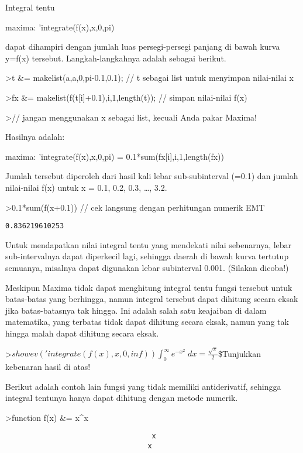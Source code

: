 \documentclass[
]{book}
\begin{document}
Integral tentu

maxima: 'integrate(f(x),x,0,pi)

dapat dihampiri dengan jumlah luas persegi-persegi panjang di bawah kurva y=f(x) tersebut. Langkah-langkahnya adalah sebagai berikut.

\textgreater t \&= makelist(a,a,0,pi-0.1,0.1); // t sebagai list untuk menyimpan nilai-nilai x

\textgreater fx \&= makelist(f(t{[}i{]}+0.1),i,1,length(t)); // simpan nilai-nilai f(x)

\textgreater// jangan menggunakan x sebagai list, kecuali Anda pakar Maxima!

Hasilnya adalah:

maxima: 'integrate(f(x),x,0,pi) = 0.1*sum(fx{[}i{]},i,1,length(fx))

Jumlah tersebut diperoleh dari hasil kali lebar sub-subinterval (=0.1) dan jumlah nilai-nilai f(x) untuk x = 0.1, 0.2, 0.3, \ldots, 3.2.

\textgreater0.1*sum(f(x+0.1)) // cek langsung dengan perhitungan numerik EMT

\begin{verbatim}
0.836219610253
\end{verbatim}

Untuk mendapatkan nilai integral tentu yang mendekati nilai sebenarnya, lebar sub-intervalnya dapat diperkecil lagi, sehingga daerah di bawah kurva tertutup semuanya, misalnya dapat digunakan lebar subinterval 0.001. (Silakan dicoba!)

Meskipun Maxima tidak dapat menghitung integral tentu fungsi tersebut untuk batas-batas yang berhingga, namun integral tersebut dapat dihitung secara eksak jika batas-batasnya tak hingga. Ini adalah salah satu keajaiban di dalam matematika, yang terbatas tidak dapat dihitung secara eksak, namun yang tak hingga malah dapat dihitung secara eksak.

\textgreater{}\(showev('integrate(f(x),x,0,inf))\)\(\int_{0}^{\infty }{e^ {- x^2 }\;dx}=\frac{\sqrt{\pi}}{2}\)\$Tunjukkan kebenaran hasil di atas!

Berikut adalah contoh lain fungsi yang tidak memiliki antiderivatif, sehingga integral tentunya hanya dapat dihitung dengan metode numerik.

\textgreater function f(x) \&= x\^{}x

\begin{verbatim}
                                   x
                                  x
\end{verbatim}
\end{document}
